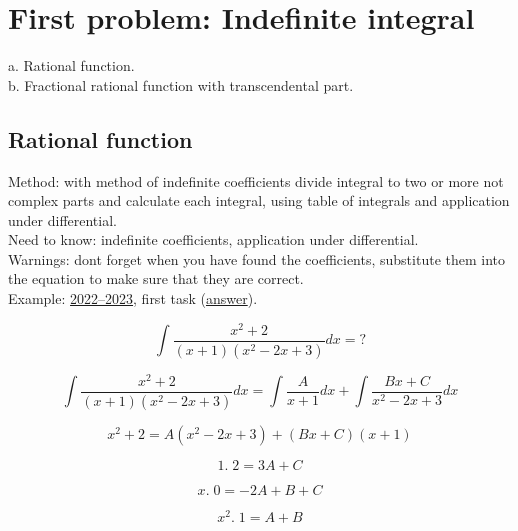 \documentclass{article}
\begin{document}
\section{First problem: Indefinite integral}
a. Rational function. \\
b. Fractional rational function with transcendental part.

\subsection{Rational function}
Method: with method of indefinite coefficients divide integral to two or more not complex parts and calculate each integral, using table of integrals and application under differential. \\
Need to know: indefinite coefficients, application under differential. \\
Warnings: dont forget when you have found the coefficients, substitute them into the equation to make sure that they are correct. \\
Example: \href{https://old.mipt.ru/education/chair/mathematics/exams/exams/2022-23/%D0%9C%D0%90%D0%98%D0%B8%D0%A0_%D0%92_23.pdf}{2022–2023}, first task (\href{https://old.mipt.ru/education/chair/mathematics/exams/exams/2022-23/%D0%9C%D0%90%D0%98%D0%B8%D0%A0_%D0%92_23%D0%BE%D1%82%D0%B2%D0%B5%D1%82%D1%8B.pdf}{answer}).

\begin{equation}
    \int \frac{x^2+2}{(x+1)(x^2-2x+3)}dx = ?
\end{equation}

\begin{equation*}
    \int \frac{x^2+2}{(x+1)(x^2-2x+3)}dx = \int \frac{A}{x+1}dx + \int \frac{Bx+C}{x^2-2x+3}dx
\end{equation*}

\begin{equation}
    x^2+2 = A(x^2-2x+3) + (Bx+C)(x+1)
\end{equation}

\begin{equation*}
    1. \; 2 = 3A + C
\end{equation*}

\begin{equation*}
    x. \; 0 = -2A + B + C
\end{equation*}

\begin{equation*}
    x^2. \; 1 = A + B
\end{equation*}
\end{document}
